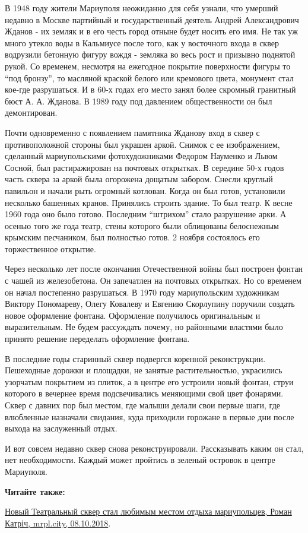 
В 1948 году жители Мариуполя неожиданно для себя узнали, что умерший недавно в
Москве партийный и государственный деятель Андрей Александрович Жданов - их
земляк и в его честь город отныне будет носить его имя. Не так уж много утекло
воды в Кальмиусе после того, как у восточного входа в сквер водрузили бетонную
фигуру вождя - земляка во весь рост и призывно поднятой рукой. Со временем,
несмотря на ежегодное покрытие поверхности фигуры то \enquote{под бронзу}, то масляной
краской белого или кремо­вого цвета, монумент стал кое-где разрушаться. И в
60-х годах его место занял более скромный гранитный бюст А. А. Жданова. В 1989
году под давлением общественности он был демонтирован.

Почти одновременно с появлением памятника Жданову вход в сквер с
противоположной стороны был украшен аркой. Снимок с ее изображением, сделанный
мариуполь­скими фотохудожниками Федором Науменко и Львом Сосной, был
растиражирован на почтовых открытках. В середине 50-х годов часть сквера за
аркой была огорожена дощатым забором. Снесли круглый павильон и начали рыть
огромный котлован. Когда он был готов, установили несколько башенных кранов.
Принялись строить здание. То был  театр. К весне 1960 года оно было готово.
Последним \enquote{штрихом} стало разрушение арки. А осенью того же года театр, стены
которого были облицованы белоснежным крымским песчаником, был полностью готов.
2 ноября состоялось его торжественное открытие.

Через несколько лет после окончания Отечественной войны был построен фонтан с
чашей из железобетона. Он запечатлен на почтовых открытках. Но со временем он
начал постепенно разрушаться. В 1970 году мариупольским художникам Виктору
Пономареву, Олегу Ковалеву и Евгению Скорлупину поручили создать новое
оформление фонтана. Оформление получилось оригинальным и выразительным. Не
будем рассуждать почему, но районными властями было принято решение переделать
оформление фонтана.


В последние годы старинный сквер подвергся коренной реконструкции. Пешеходные
дорожки и площадки, не занятые растительно­стью, украсились узорчатым покрытием
из плиток, а в центре его устроили новый фонтан, струи которого в вечернее
время подсвечивались меняющими свой цвет фонарями. Сквер с давних пор был
местом, где малыши делали свои первые шаги, где влюбленные назначали свидания,
куда приходили горожане в первые дни после выхода на заслуженный отдых.

И вот совсем недавно сквер снова реконструировали. Рассказывать каким он стал,
нет необходимости. Каждый может пройтись в зеленый островок в центре Мариуполя.

\textbf{Читайте также:} 

\href{https://mrpl.city/news/view/novyj-teatralnyj-skver-stal-lyubimym-mestom-otdyha-mariupoltsev-foto}{%
Новый Театральный сквер стал любимым местом отдыха мариупольцев, Роман Катріч, mrpl.city, 08.10.2018}.

